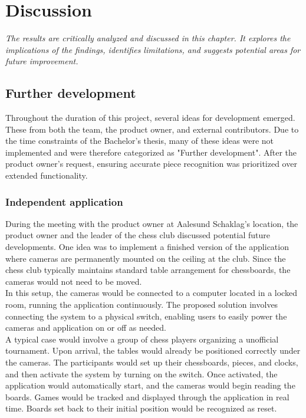 \chapter{Discussion}

\begin{center}
    \textit{The results are critically analyzed and discussed in this chapter. It explores the implications of the findings, identifies limitations, and suggests potential areas for future improvement.}
\end{center}

\section{Further development}
Throughout the duration of this project, several ideas for development emerged. These from both the team, the product owner, and external contributors. Due to the time constraints of the Bachelor’s thesis, many of these ideas were not implemented and were therefore categorized as "Further development". After the product owner's request, ensuring accurate piece recognition was prioritized over extended functionality.

\subsection{Independent application}
During the meeting with the product owner at Aalesund Schaklag's location, the product owner and the leader of the chess club discussed potential future developments. One idea was to implement a finished version of the application where cameras are permanently mounted on the ceiling at the club. Since the chess club typically maintains standard table arrangement for chessboards, the cameras would not need to be moved. \\

In this setup, the cameras would be connected to a computer located in a locked room, running the application continuously. The proposed solution involves connecting the system to a physical switch, enabling users to easily power the cameras and application on or off as needed. \\

A typical case would involve a group of chess players organizing a unofficial tournament. Upon arrival, the tables would already be positioned correctly under the cameras. The participants would set up their chessboards, pieces, and clocks, and then activate the system by turning on the switch. Once activated, the application would automatically start, and the cameras would begin reading the boards. Games would be tracked and displayed through the application in real time. Boards set back to their initial position would be recognized as reset. \\

